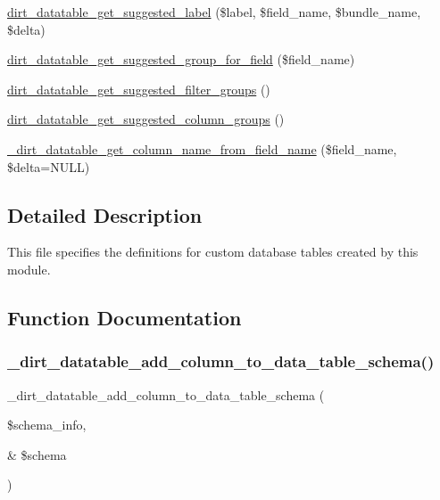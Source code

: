 \begin{DoxyCompactItemize}
\item 
\mbox{\hyperlink{dirt__datatable_8table__schema_8inc_ab441635bc7da4323a7810bdd2541163b}{dirt\+\_\+datatable\+\_\+get\+\_\+suggested\+\_\+label}} (\$label, \$field\+\_\+name, \$bundle\+\_\+name, \$delta)
\item 
\mbox{\hyperlink{dirt__datatable_8table__schema_8inc_ab527de6cffbcf5664354269dacc6757f}{dirt\+\_\+datatable\+\_\+get\+\_\+suggested\+\_\+group\+\_\+for\+\_\+field}} (\$field\+\_\+name)
\item 
\mbox{\hyperlink{dirt__datatable_8table__schema_8inc_afd9f0909a04d9c05d36d30086f482733}{dirt\+\_\+datatable\+\_\+get\+\_\+suggested\+\_\+filter\+\_\+groups}} ()
\item 
\mbox{\hyperlink{dirt__datatable_8table__schema_8inc_a3030e2c6bb10f5407fe9b013a145eb61}{dirt\+\_\+datatable\+\_\+get\+\_\+suggested\+\_\+column\+\_\+groups}} ()
\item 
\mbox{\hyperlink{dirt__datatable_8table__schema_8inc_aff79e117540ff2f265041fbd3a313f94}{\+\_\+dirt\+\_\+datatable\+\_\+get\+\_\+column\+\_\+name\+\_\+from\+\_\+field\+\_\+name}} (\$field\+\_\+name, \$delta=N\+U\+LL)
\end{DoxyCompactItemize}


\subsection{Detailed Description}
This file specifies the definitions for custom database tables created by this module. 

\subsection{Function Documentation}
\mbox{\label{dirt__datatable_8table__schema_8inc_aa7b7fb145809b5d03fd4ca88f513e72c}} 
\subsubsection{\texorpdfstring{\+\_\+dirt\+\_\+datatable\+\_\+add\+\_\+column\+\_\+to\+\_\+data\+\_\+table\+\_\+schema()}{\_dirt\_datatable\_add\_column\_to\_data\_table\_schema()}}
{\footnotesize\ttfamily \+\_\+dirt\+\_\+datatable\+\_\+add\+\_\+column\+\_\+to\+\_\+data\+\_\+table\+\_\+schema (\begin{DoxyParamCaption}\item[{}]{\$schema\+\_\+info,  }\item[{\&}]{\$schema }\end{DoxyParamCaption})}

